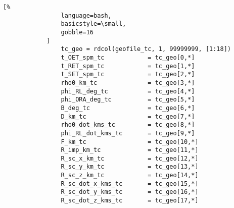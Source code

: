 \documentclass[crop=false,class=article,oneside]{standalone}
\begin{document}
            \begin{lstlisting}[%
                language=bash,
                basicstyle=\small,
                gobble=16
            ]
                tc_geo = rdcol(geofile_tc, 1, 99999999, [1:18])
                t_OET_spm_tc            = tc_geo[0,*]
                t_RET_spm_tc            = tc_geo[1,*]
                t_SET_spm_tc            = tc_geo[2,*]
                rho0_km_tc              = tc_geo[3,*]
                phi_RL_deg_tc           = tc_geo[4,*]
                phi_ORA_deg_tc          = tc_geo[5,*]
                B_deg_tc                = tc_geo[6,*]
                D_km_tc                 = tc_geo[7,*]
                rho0_dot_kms_tc         = tc_geo[8,*]
                phi_RL_dot_kms_tc       = tc_geo[9,*]
                F_km_tc                 = tc_geo[10,*]
                R_imp_km_tc             = tc_geo[11,*]
                R_sc_x_km_tc            = tc_geo[12,*]
                R_sc_y_km_tc            = tc_geo[13,*]
                R_sc_z_km_tc            = tc_geo[14,*]
                R_sc_dot_x_kms_tc       = tc_geo[15,*]
                R_sc_dot_y_kms_tc       = tc_geo[16,*]
                R_sc_dot_z_kms_tc       = tc_geo[17,*]
            \end{lstlisting}
\end{document}
